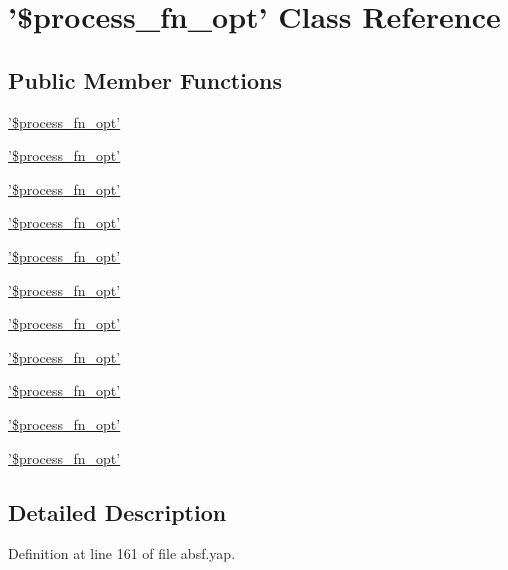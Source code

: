 \section{'\$process\+\_\+fn\+\_\+opt' Class Reference}
\label{class'_0Bprocess__fn__opt'}
\subsection*{Public Member Functions}
\begin{DoxyCompactItemize}
\item 
\hyperlink{class'_0Bprocess__fn__opt'_aa0aa267c3ff9650c092f989c9b0018c1}{'\$process\+\_\+fn\+\_\+opt'}
\item 
\hyperlink{class'_0Bprocess__fn__opt'_aa0aa267c3ff9650c092f989c9b0018c1}{'\$process\+\_\+fn\+\_\+opt'}
\item 
\hyperlink{class'_0Bprocess__fn__opt'_aa0aa267c3ff9650c092f989c9b0018c1}{'\$process\+\_\+fn\+\_\+opt'}
\item 
\hyperlink{class'_0Bprocess__fn__opt'_aa0aa267c3ff9650c092f989c9b0018c1}{'\$process\+\_\+fn\+\_\+opt'}
\item 
\hyperlink{class'_0Bprocess__fn__opt'_aa0aa267c3ff9650c092f989c9b0018c1}{'\$process\+\_\+fn\+\_\+opt'}
\item 
\hyperlink{class'_0Bprocess__fn__opt'_aa0aa267c3ff9650c092f989c9b0018c1}{'\$process\+\_\+fn\+\_\+opt'}
\item 
\hyperlink{class'_0Bprocess__fn__opt'_aa0aa267c3ff9650c092f989c9b0018c1}{'\$process\+\_\+fn\+\_\+opt'}
\item 
\hyperlink{class'_0Bprocess__fn__opt'_aa0aa267c3ff9650c092f989c9b0018c1}{'\$process\+\_\+fn\+\_\+opt'}
\item 
\hyperlink{class'_0Bprocess__fn__opt'_aa0aa267c3ff9650c092f989c9b0018c1}{'\$process\+\_\+fn\+\_\+opt'}
\item 
\hyperlink{class'_0Bprocess__fn__opt'_aa0aa267c3ff9650c092f989c9b0018c1}{'\$process\+\_\+fn\+\_\+opt'}
\item 
\hyperlink{class'_0Bprocess__fn__opt'_aa0aa267c3ff9650c092f989c9b0018c1}{'\$process\+\_\+fn\+\_\+opt'}
\end{DoxyCompactItemize}


\subsection{Detailed Description}


Definition at line 161 of file absf.\+yap.



